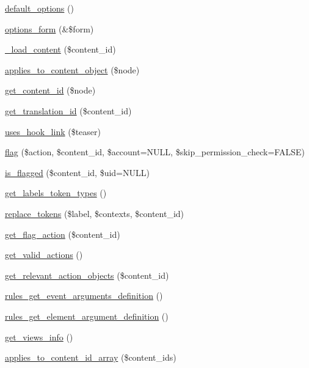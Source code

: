 \begin{CompactItemize}
\item 
\hyperlink{classflag__node_e896b1a9f9ef4b26514c52540ec0ef70}{default\_\-options} ()
\item 
\hyperlink{classflag__node_5130212d8df4885b0fc5bcace0f6345d}{options\_\-form} (\&\$form)
\item 
\hyperlink{classflag__node_3e41593b4effc42f96b500f16b2a3c12}{\_\-load\_\-content} (\$content\_\-id)
\item 
\hyperlink{classflag__node_d2b546768e89ad2622ba698f22146df8}{applies\_\-to\_\-content\_\-object} (\$node)
\item 
\hyperlink{classflag__node_7615ffc75f3b60c56032d7df1ad1e734}{get\_\-content\_\-id} (\$node)
\item 
\hyperlink{classflag__node_c391b5c12fd0ad096dcbc50112923957}{get\_\-translation\_\-id} (\$content\_\-id)
\item 
\hyperlink{classflag__node_60653b0f36b6161d0e2ae012ff94319f}{uses\_\-hook\_\-link} (\$teaser)
\item 
\hyperlink{classflag__node_b9cba098ce624c77b20d67bf51ee8f4f}{flag} (\$action, \$content\_\-id, \$account=NULL, \$skip\_\-permission\_\-check=FALSE)
\item 
\hyperlink{classflag__node_4e9609c89fcd8ec905c6537d241fd49f}{is\_\-flagged} (\$content\_\-id, \$uid=NULL)
\item 
\hyperlink{classflag__node_22f752cd73a076e6a36c76b6950e139f}{get\_\-labels\_\-token\_\-types} ()
\item 
\hyperlink{classflag__node_38932e35c8b4b0191a118ffde9c27d97}{replace\_\-tokens} (\$label, \$contexts, \$content\_\-id)
\item 
\hyperlink{classflag__node_124cd24063689c68b497c83707dc4f40}{get\_\-flag\_\-action} (\$content\_\-id)
\item 
\hyperlink{classflag__node_6bb9b8d25c34816cd3e7b5c11038374a}{get\_\-valid\_\-actions} ()
\item 
\hyperlink{classflag__node_9578593ef74f207710a83242de8325f9}{get\_\-relevant\_\-action\_\-objects} (\$content\_\-id)
\item 
\hyperlink{classflag__node_eecfa8b26fc30aaafc376e92f6a2c00b}{rules\_\-get\_\-event\_\-arguments\_\-definition} ()
\item 
\hyperlink{classflag__node_cb9a883b4910f72b836875066fc31c2c}{rules\_\-get\_\-element\_\-argument\_\-definition} ()
\item 
\hyperlink{classflag__node_bea5310889ebc0a8564823f3067d5846}{get\_\-views\_\-info} ()
\item 
\hyperlink{classflag__node_c1e88f053ece925c7f28c0e8fe4b020f}{applies\_\-to\_\-content\_\-id\_\-array} (\$content\_\-ids)
\end{CompactItemize}


